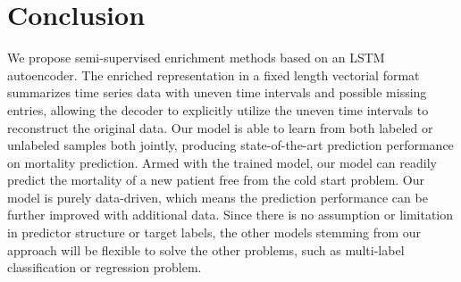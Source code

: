 \iffalse
We proposed models based on LSTMs that can learn good video representations.
First, given that the proposed machine learning method is purely data-driven, our model may vary if starting from different datasets. As more data become available, the whole procedure can easily be repeated to obtain more accurate models.
We does not assume any property about dataset.

In this paper, we considered the identification of COVID-19 cases from X-ray images and proposed a novel semi-supervised deep architecture that can distinguish between the three cases of Healthy, non-COVID pneumonia, COVID-19 infection based on the chest X-ray manifestation of these classes. The proposed methodology is comprised of two modules: 1) the Task-Based Feature Extraction Network (TFEN), and 2) the COVID-19 Identification Network (CIN). 
\fi
\section{Conclusion}
We propose semi-supervised enrichment methods based on an LSTM autoencoder. The enriched representation in a fixed length vectorial format summarizes time series data with uneven time intervals and possible missing entries, allowing the decoder to explicitly utilize the uneven time intervals to reconstruct the original data. Our model is able to learn from both labeled or unlabeled samples both jointly, producing state-of-the-art prediction performance on mortality prediction. Armed with the trained model, our model can readily predict the mortality of a new patient free from the cold start problem. Our model is purely data-driven, which means the prediction performance can be further improved with additional data. Since there is no assumption or limitation in predictor structure or target labels, the other models stemming from our approach will be flexible to solve the other problems, such as multi-label classification or regression problem.
\clearpage